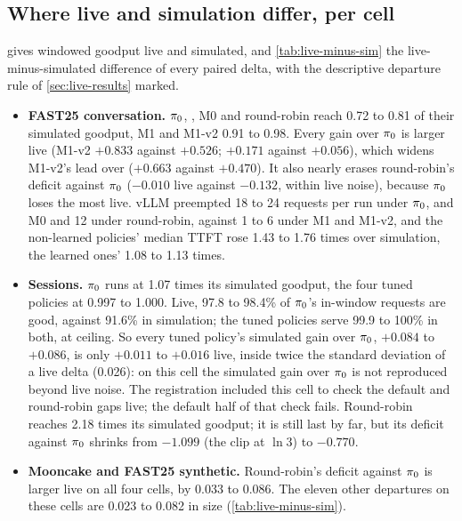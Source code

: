\subsection{Where live and simulation differ, per cell}

 gives windowed goodput live and simulated, and \cref{tab:live-minus-sim} the
live-minus-simulated difference of every paired delta, with the descriptive departure rule of
\cref{sec:live-results} marked.
\begin{itemize}
  \item \textbf{FAST25 conversation.} $\pi_{0}$, , M0 and round-robin reach 0.72 to
    0.81 of their simulated goodput, M1 and M1-v2 0.91 to 0.98. Every gain over $\pi_{0}$ is larger
    live (M1-v2 $+0.833$ against $+0.526$;  $+0.171$ against $+0.056$), which widens
    M1-v2's lead over  ($+0.663$ against $+0.470$). It also nearly erases round-robin's
    deficit against $\pi_{0}$ ($-0.010$ live against $-0.132$, within live noise), because $\pi_{0}$
    loses the most live. vLLM preempted 18 to 24 requests per run under $\pi_{0}$,  and
    M0 and 12 under round-robin, against 1 to 6 under M1 and M1-v2, and the non-learned policies'
    median TTFT rose 1.43 to 1.76 times over simulation, the learned ones' 1.08 to 1.13 times.
  \item \textbf{Sessions.} $\pi_{0}$ runs at 1.07 times its simulated goodput, the four tuned policies
    at 0.997 to 1.000. Live, 97.8 to 98.4\% of $\pi_{0}$'s in-window requests are good, against 91.6\%
    in simulation; the tuned policies serve 99.9 to 100\% in both, at ceiling. So every tuned policy's
    simulated gain over $\pi_{0}$, $+0.084$ to $+0.086$, is only $+0.011$ to $+0.016$ live, inside
    twice the standard deviation of a live delta (0.026): on this cell the simulated gain over
    $\pi_{0}$ is not reproduced beyond live noise. The registration included this cell to check the
    default and round-robin gaps live; the default half of that check fails. Round-robin reaches 2.18
    times its simulated goodput; it is still last by far, but its deficit against $\pi_{0}$ shrinks
    from $-1.099$ (the clip at $\ln 3$) to $-0.770$.
  \item \textbf{Mooncake and FAST25 synthetic.} Round-robin's deficit against $\pi_{0}$ is larger live on
    all four cells, by 0.033 to 0.086. The eleven other departures on these cells are 0.023 to 0.082 in
    size (\cref{tab:live-minus-sim}).
\end{itemize}

